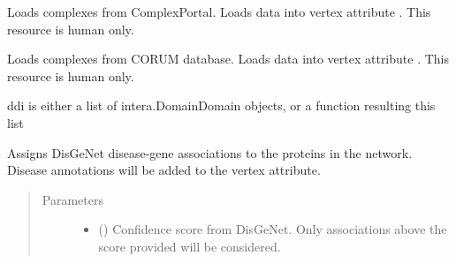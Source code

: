 \documentclass[letterpaper,10pt,english]{sphinxmanual}
\begin{document}
\begin{fulllineitems}
\begin{fulllineitems}
\end{fulllineitems}


\begin{fulllineitems}
\label{\detokenize{main:pypath.main.PyPath.load_complexportal}}
Loads complexes from ComplexPortal. Loads data into vertex attribute
.
This resource is human only.

\end{fulllineitems}


\begin{fulllineitems}
\label{\detokenize{main:pypath.main.PyPath.load_corum}}
Loads complexes from CORUM database. Loads data into vertex attribute
.
This resource is human only.

\end{fulllineitems}


\begin{fulllineitems}
\label{\detokenize{main:pypath.main.PyPath.load_ddi}}
ddi is either a list of intera.DomainDomain objects,
or a function resulting this list

\end{fulllineitems}


\begin{fulllineitems}
\label{\detokenize{main:pypath.main.PyPath.load_disgenet}}
Assigns DisGeNet disease-gene associations to the proteins
in the network. Disease annotations will be added to the 
vertex attribute.
\begin{quote}\begin{description}
\item[{Parameters}] \leavevmode\begin{itemize}
\item {} 
 () \textendash{} Confidence score from DisGeNet. Only associations
above the score provided will be considered.


\end{itemize}
\end{description}
\end{quote}
\end{fulllineitems}
\end{fulllineitems}
\end{document}
